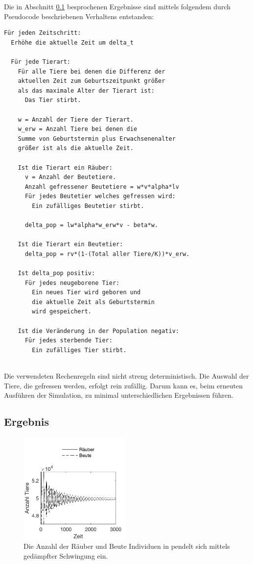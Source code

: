 \documentclass[a4paper,twoside]{article}
\begin{document}
	Die in Abschnitt \ref{sec:Ergebnis_Agent_Model} besprochenen Ergebnisse sind mittels folgendem durch Pseudocode beschriebenen Verhaltens entstanden:
	
	\begin{small}
	\begin{verbatim}
Für jeden Zeitschritt:
  Erhöhe die aktuelle Zeit um delta_t

  Für jede Tierart:
    Für alle Tiere bei denen die Differenz der
    aktuellen Zeit zum Geburtszeitpunkt größer
    als das maximale Alter der Tierart ist:
      Das Tier stirbt.

    w = Anzahl der Tiere der Tierart.
    w_erw = Anzahl Tiere bei denen die 
    Summe von Geburtstermin plus Erwachsenenalter 
    größer ist als die aktuelle Zeit.

    Ist die Tierart ein Räuber:
      v = Anzahl der Beutetiere.
      Anzahl gefressener Beutetiere = w*v*alpha*lv
      Für jedes Beutetier welches gefressen wird:
        Ein zufälliges Beutetier stirbt.
            
      delta_pop = lw*alpha*w_erw*v - beta*w.

    Ist die Tierart ein Beutetier:
      delta_pop = rv*(1-(Total aller Tiere/K))*v_erw.

    Ist delta_pop positiv:
      Für jedes neugeborene Tier:
        Ein neues Tier wird geboren und 
        die aktuelle Zeit als Geburtstermin 
        wird gespeichert.

    Ist die Veränderung in der Population negativ:
      Für jedes sterbende Tier:
        Ein zufälliges Tier stirbt.	
 		
	\end{verbatim}
	\end{small}
	
	Die verwendeten Rechenregeln sind nicht streng deterministisch. Die Auswahl der Tiere, die gefressen werden, erfolgt rein zufällig. Darum kann es, beim erneuten Ausführen der Simulation, zu minimal unterschiedlichen Ergebnissen führen.
	
	\subsection{Ergebnis}\label{sec:Ergebnis_Agent_Model}
	
	\begin{figure}[!h]
  		\centering
 		\includegraphics[width=5.5cm]{Diagramme/agent_model_damped.png}
  		\caption{Die Anzahl der Räuber und Beute Individuen in pendelt sich mittels gedämpfter Schwingung ein.}
  		\label{fig:agent_model_damped}
	\end{figure}
	
\end{document}
